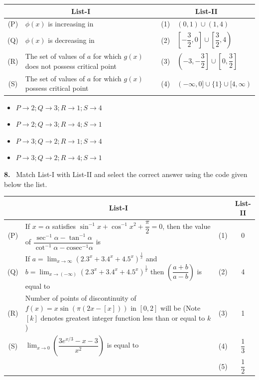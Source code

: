 \documentclass[10pt]{extarticle}
\newcommand{\qn}[1]{\par\smallskip\noindent\textbf{#1.}~}
\newenvironment{qoptions}{\begin{itemize}[leftmargin=1.8em,itemsep=1pt,topsep=2pt,label={}]}{\end{itemize}}
\newcommand{\opt}[2]{\item[(#1)] #2}
\begin{document}
\begin{multicols}{2}
\begin{center}
\begin{tabular}{|c|l|c|l|}
\hline
\multicolumn{2}{|c|}{List-I} & \multicolumn{2}{c|}{List-II}\\[3pt]
\hline
(P) & $\phi(x)$ is increasing in & (1) & $(0,1)\cup(1,4)$\\[4pt]
(Q) & $\phi(x)$ is decreasing in & (2) & $\left[-\dfrac32,0\right]\cup\left[\dfrac32,4\right)$\\[6pt]
(R) & \parbox[t]{3.1cm}{The set of values of $a$ for which $g(x)$ does not possess critical point} & (3) & $\left(-3,-\dfrac32\right]\cup\left[0,\dfrac32\right]$\\[10pt]
(S) & \parbox[t]{3.1cm}{The set of values of $a$ for which $g(x)$ possess critical point} & (4) & $(-\infty,0]\cup\{1\}\cup[4,\infty)$\\[3pt]
\hline
\end{tabular}
\end{center}
\begin{qoptions}
\opt{A}{$P\to2;Q\to3;R\to1;S\to4$}
\opt{B}{$P\to2;Q\to3;R\to4;S\to1$}
\opt{C}{$P\to3;Q\to2;R\to1;S\to4$}
\opt{D}{$P\to3;Q\to2;R\to4;S\to1$}
\end{qoptions}
\qn{8} Match List-I with List-II and select the correct answer using the code given below the list.
\begin{center}\footnotesize\renewcommand{\arraystretch}{1.1}\setlength{\extrarowheight}{3.5pt}\setlength{\tabcolsep}{2pt}
\begin{tabular}{|c|l|c|c|}
\hline
 & \multicolumn{1}{c|}{List-I} & & List-II\\[3pt]
\hline
(P) & \parbox[t]{4.4cm}{If $x=\alpha$ satisfies $\sin^{-1}x+\cos^{-1}x^2+\dfrac\pi2=0$, then the value of $\dfrac{\sec^{-1}\alpha-\tan^{-1}\alpha}{\cot^{-1}\alpha-\mathrm{cosec}^{-1}\alpha}$ is} & (1) & 0\\[14pt]
(Q) & \parbox[t]{4.4cm}{If $a=\displaystyle\lim_{x\to\infty}\left(2.3^x+3.4^x+4.5^x\right)^{\frac1x}$ and $b=\displaystyle\lim_{x\to(-\infty)}\left(2.3^x+3.4^x+4.5^x\right)^{\frac1x}$ then $\left(\dfrac{a+b}{a-b}\right)$ is equal to} & (2) & 4\\[22pt]
(R) & \parbox[t]{4.4cm}{Number of points of discontinuity of $f(x)=x\sin(\pi(2x-[x]))$ in $[0,2]$ will be (Note $[k]$ denotes greatest integer function less than or equal to $k$)} & (3) & 1\\[22pt]
(S) & \parbox[t]{4.4cm}{$\displaystyle\lim_{x\to0}\left(\dfrac{3e^{x/3}-x-3}{x^2}\right)$ is equal to} & (4) & $\dfrac13$\\[6pt]
 & & (5) & $\dfrac12$\\[6pt]

\end{tabular}
\end{center}
\end{multicols}
\end{document}
